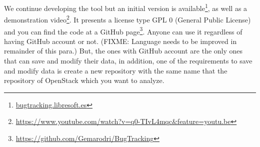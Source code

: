 \documentclass[ifip]{svmult}
\begin{document}
We continue developing the tool but an initial version is available\footnote{\url{bugtracking.libresoft.es}}, as well as a demonstration video\footnote{\url{https://www.youtube.com/watch?v=q0-TIvL4mqc&feature=youtu.be}}. It presents a license type GPL 0 (General Public License) and you can find the code at a GitHub page\footnote{\url{https://github.com/Gemarodri/BugTracking}}. Anyone can use it regardless of having GitHub account or not. (FIXME: Language needs to be improved in remainder of this para.) But, the ones with GitHub account are the only ones that can save and modify their data, in addition, one of the requirements to save and modify data is create a new repository with the same name that the repository of OpenStack which you want to analyze.




\end{document}
